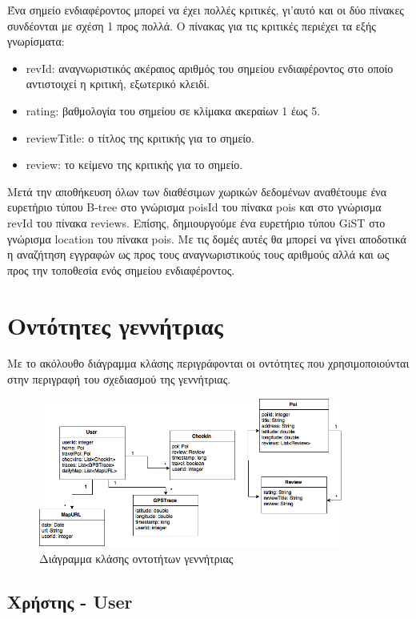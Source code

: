 Ένα σημείο ενδιαφέροντος μπορεί να έχει πολλές κριτικές, γι'αυτό και οι δύο πίνακες συνδέονται με σχέση 1 προς πολλά. Ο πίνακας για τις κριτικές περιέχει τα εξής 
γνωρίσματα:

\begin{itemize}
 \item revId: αναγνωριστικός ακέραιος αριθμός του σημείου ενδιαφέροντος στο οποίο αντιστοιχεί η κριτική, εξωτερικό κλειδί.
 \item rating: βαθμολογία του σημείου σε κλίμακα ακεραίων 1 έως 5.
 \item reviewTitle: ο τίτλος της κριτικής για το σημείο.
 \item review: το κείμενο της κριτικής για το σημείο.
\end{itemize}

Μετά την αποθήκευση όλων των διαθέσιμων χωρικών δεδομένων αναθέτουμε ένα ευρετήριο τύπου B-tree στο γνώρισμα poisId του πίνακα pois και στο γνώρισμα revId του πίνακα 
reviews. Επίσης, δημιουργούμε ένα ευρετήριο τύπου GiST στο γνώρισμα location του πίνακα pois. Με τις δομές αυτές θα μπορεί να γίνει αποδοτικά η αναζήτηση 
εγγραφών ως προς τους αναγνωριστικούς τους αριθμούς αλλά και ως προς την τοποθεσία ενός σημείου ενδιαφέροντος. 

\section{Οντότητες γεννήτριας}

Με το ακόλουθο διάγραμμα κλάσης περιγράφονται οι οντότητες που χρησιμοποιούνται στην περιγραφή του σχεδιασμού της γεννήτριας.

\begin{figure}[H]
  \centering
  \includegraphics[width=0.9\textwidth]{figures/class_diagram.png}
  \caption{Διάγραμμα κλάσης οντοτήτων γεννήτριας}
\end{figure}

\subsection{Χρήστης - User}

